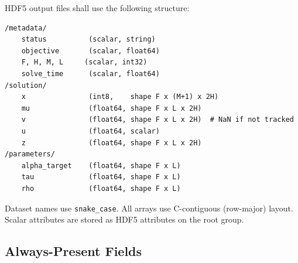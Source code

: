 \documentclass[11pt,a4paper]{article}
\begin{document}
HDF5 output files shall use the following structure:
\begin{lstlisting}
/metadata/
    status          (scalar, string)
    objective       (scalar, float64)
    F, H, M, L     (scalar, int32)
    solve_time      (scalar, float64)
/solution/
    x               (int8,    shape F x (M+1) x 2H)
    mu              (float64, shape F x L x 2H)
    v               (float64, shape F x L x 2H)  # NaN if not tracked
    u               (float64, scalar)
    z               (float64, shape F x L x 2H)
/parameters/
    alpha_target    (float64, shape F x L)
    tau             (float64, shape F x L)
    rho             (float64, shape F x L)
\end{lstlisting}
Dataset names use \texttt{snake\_case}. All arrays use C-contiguous (row-major) layout.
Scalar attributes are stored as HDF5 attributes on the root group.

\subsection{Always-Present Fields}
\end{document}
